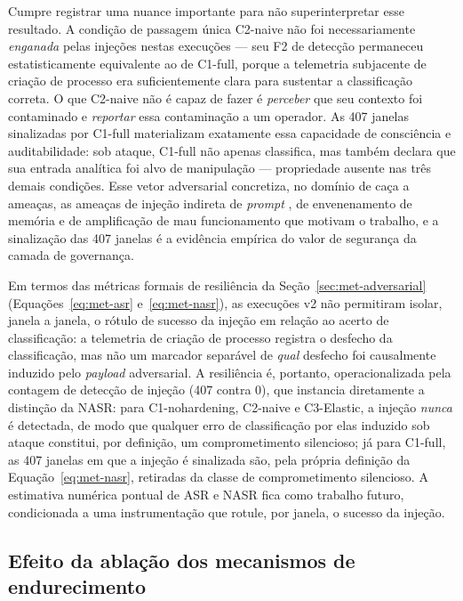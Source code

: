 Cumpre registrar uma nuance importante para não superinterpretar esse resultado.
A condição de passagem única C2-naive não foi necessariamente \emph{enganada}
pelas injeções nestas execuções --- seu F2 de detecção permaneceu estatisticamente
equivalente ao de C1-full, porque a telemetria subjacente de criação de processo
era suficientemente clara para sustentar a classificação correta. O que C2-naive
não é capaz de fazer é \emph{perceber} que seu contexto foi contaminado e
\emph{reportar} essa contaminação a um operador. As 407 janelas sinalizadas por
C1-full materializam exatamente essa capacidade de consciência e auditabilidade:
sob ataque, C1-full não apenas classifica, mas também declara que sua entrada
analítica foi alvo de manipulação --- propriedade ausente nas três demais
condições. Esse vetor adversarial concretiza, no domínio de caça a ameaças, as
ameaças de injeção indireta de \textit{prompt} \cite{zhan2024injecagent}, de
envenenamento de memória \cite{NEURIPS2024_eb113910} e de amplificação de mau
funcionamento \cite{zhang2024breaking} que motivam o trabalho, e a sinalização
das 407 janelas é a evidência empírica do valor de segurança da camada de
governança.

Em termos das métricas formais de resiliência da
Seção~\ref{sec:met-adversarial} (Equações~\ref{eq:met-asr}
e~\ref{eq:met-nasr}), as execuções v2 não permitiram isolar, janela a janela, o
rótulo de sucesso da injeção em relação ao acerto de classificação: a telemetria
de criação de processo registra o desfecho da classificação, mas não um marcador
separável de \emph{qual} desfecho foi causalmente induzido pelo \textit{payload}
adversarial. A resiliência é, portanto, operacionalizada pela contagem de
detecção de injeção (407 contra 0), que instancia diretamente a distinção da
NASR: para C1-nohardening, C2-naive e C3-Elastic, a injeção \emph{nunca} é
detectada, de modo que qualquer erro de classificação por elas induzido sob
ataque constitui, por definição, um comprometimento silencioso; já para C1-full,
as 407 janelas em que a injeção é sinalizada são, pela própria definição da
Equação~\ref{eq:met-nasr}, retiradas da classe de comprometimento silencioso. A
estimativa numérica pontual de ASR e NASR fica como trabalho futuro,
condicionada a uma instrumentação que rotule, por janela, o sucesso da injeção.

\subsection{Efeito da ablação dos mecanismos de endurecimento}
\label{subsec:res-ablacao}

